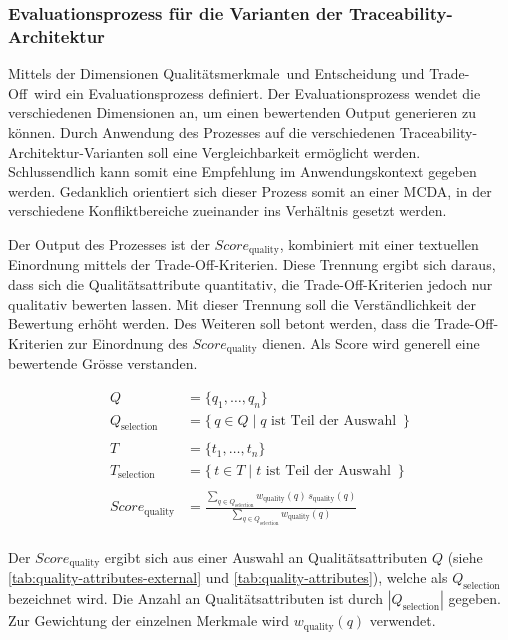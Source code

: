 \subsubsection{Evaluationsprozess für die Varianten der Traceability-Architektur}
\label{sec:evaluationprocess-traceability-variants}

Mittels der Dimensionen \flqq Qualitätsmerkmale\frqq\ und \flqq Entscheidung und Trade-Off\frqq\ wird ein Evaluationsprozess definiert. Der Evaluationsprozess wendet die verschiedenen Dimensionen an, um einen bewertenden Output generieren zu können. Durch Anwendung des Prozesses auf die verschiedenen Traceability-Architektur-Varianten soll eine Vergleichbarkeit ermöglicht werden. Schlussendlich kann somit eine Empfehlung im Anwendungskontext gegeben werden. Gedanklich orientiert sich dieser Prozess somit an einer \ac{MCDA}, in der verschiedene Konfliktbereiche zueinander ins Verhältnis gesetzt werden.

Der Output des Prozesses ist der $Score_{\text{quality}}$, kombiniert mit einer textuellen Einordnung mittels der Trade-Off-Kriterien. Diese Trennung ergibt sich daraus, dass sich die Qualitätsattribute quantitativ, die Trade-Off-Kriterien jedoch nur qualitativ bewerten lassen. Mit dieser Trennung soll die Verständlichkeit der Bewertung erhöht werden. Des Weiteren soll betont werden, dass die Trade-Off-Kriterien zur Einordnung des $Score_{\text{quality}}$ dienen. Als Score wird generell eine bewertende Grösse verstanden.

\begin{align}
Q &= \{q_1, \dots,q_n\} \\
Q_{\text{selection}} &= \{\, q \in Q \mid q \text{ ist Teil der Auswahl } \,\} \\ \\
T &= \{t_1, \dots,t_n\} \\
T_{\text{selection}} &= \{\, t \in T \mid t \text{ ist Teil der Auswahl } \,\} \\ \\
Score_{\text{quality}} &= \frac{\sum_{q \in Q_{\text{selection}}} w_{\text{quality}}(q)\,s_{\text{quality}}(q)} {\sum_{q \in Q_{\text{selection}}} w_{\text{quality}}(q)} \\
\end{align}

Der $Score_{\text{quality}}$ ergibt sich aus einer Auswahl an Qualitätsattributen $Q$ (siehe \autoref{tab:quality-attributes-external} und \autoref{tab:quality-attributes}), welche als $Q_{\text{selection}}$ bezeichnet wird. Die Anzahl an Qualitätsattributen ist durch $|Q_{\text{selection}}|$ gegeben. Zur Gewichtung der einzelnen Merkmale wird $w_{\text{quality}}(q)$ verwendet.

